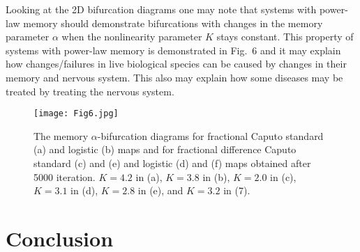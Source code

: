 \documentclass[graybox]{svmult}
\begin{document}
Looking at the 2D 
bifurcation diagrams one may note that systems with power-law memory should demonstrate 
bifurcations with changes in the memory parameter $\alpha$ when the
nonlinearity parameter $K$ stays constant. This property of
systems with power-law memory is demonstrated in 
Fig.~6 and
it may explain how changes/failures in live biological species can be
caused by changes in their memory and nervous system. This also may  
explain how some diseases may be treated by treating
the nervous system.  
\begin{figure}[!t]
\begin{center}
\texttt{[image: Fig6.jpg]}
\vspace{-0.25cm}
\caption{The memory $\alpha$-bifurcation diagrams for fractional Caputo 
standard (a) 
and logistic (b) maps and for fractional difference Caputo standard
(c) and (e) and logistic (d) and (f) maps obtained after 5000 iteration.
$K=4.2$ in (a), $K=3.8$ in (b), $K=2.0$ in (c), $K=3.1$ in (d), $K=2.8$ in (e),
and   $K=3.2$ in (7).   
}
\end{center}
\label{BDalp}
\end{figure} 


\section{Conclusion}
\label{sec:5}
\end{document}
